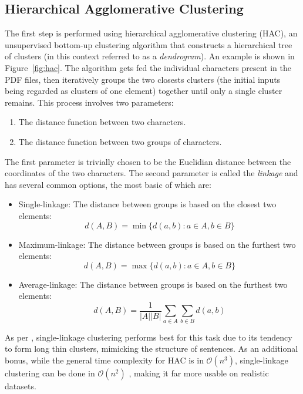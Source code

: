 \subsection{Hierarchical Agglomerative Clustering}
The first step is performed using hierarchical agglomerative clustering (HAC),
an unsupervised bottom-up clustering algorithm that constructs a hierarchical
tree of clusters (in this context referred to as a \emph{dendrogram}). An
example is shown in Figure~\ref{fig:hac}. The algorithm gets fed the individual
characters present in the PDF files, then iteratively groups the two closests
clusters (the initial inputs being regarded as clusters of one element) together
until only a single cluster remains. This process involves two parameters:
\begin{enumerate}
\item The distance function between two characters.
\item The distance function between two groups of characters.
\end{enumerate}
The first parameter is trivially chosen to be the Euclidian distance between the
coordinates of the two characters. The second parameter is called the
\emph{linkage} and has several common options, the most basic of which are:
\begin{itemize}
\item Single-linkage: The distance between groups is based on the closest two
  elements: \[ d(A, B) = \min \{ d(a, b) : a \in A, b \in B \} \]
\item Maximum-linkage: The distance between groups is based on the furthest two
  elements: \[ d(A, B) = \max \{ d(a, b) : a \in A, b \in B \} \]
\item Average-linkage: The distance between groups is based on the furthest two
  elements: \[ d(A, B) = \frac{1}{|A||B|} \sum_{a \in A}\sum_{b \in B} d(a, b) \]
\end{itemize}
As per \textcite{klampfl2014unsupervised}, single-linkage clustering performs
best for this task due to its tendency to form long thin clusters, mimicking the
structure of sentences. As an additional bonus, while the general time
complexity for HAC is in $\mathcal{O}(n^3)$, single-linkage clustering can be
done in $\mathcal{O}(n^2)$ \citep{sibson1973slink}, making it far more usable on
realistic datasets.

